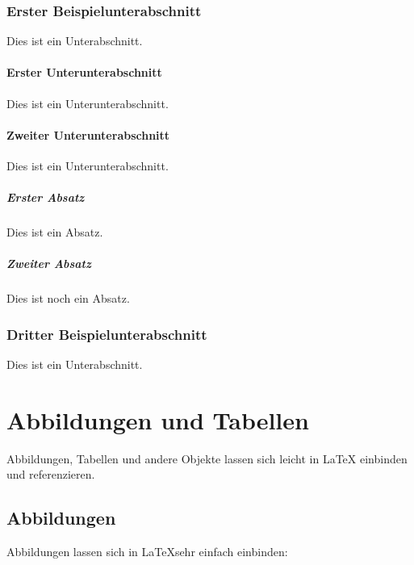 \documentclass[12pt,oneside,a4paper,bibtotoc,liststotoc]{scrreprt}
\begin{document}
\subsection{Erster Beispielunterabschnitt}

Dies ist ein Unterabschnitt.

\subsubsection{Erster Unterunterabschnitt}

Dies ist ein Unterunterabschnitt.

\subsubsection{Zweiter Unterunterabschnitt}

Dies ist ein Unterunterabschnitt.

\paragraph{Erster Absatz} Dies ist ein Absatz.

\paragraph{Zweiter Absatz} Dies ist noch ein Absatz.

\subsection{Dritter Beispielunterabschnitt}
\label{dritter_beispielunterabschnitt}

Dies ist ein Unterabschnitt.

\chapter{Abbildungen und Tabellen}

Abbildungen, Tabellen und andere Objekte lassen sich leicht in \LaTeX
einbinden und referenzieren.

\section{Abbildungen}

Abbildungen lassen sich in \LaTeX sehr einfach einbinden:
\end{document}
